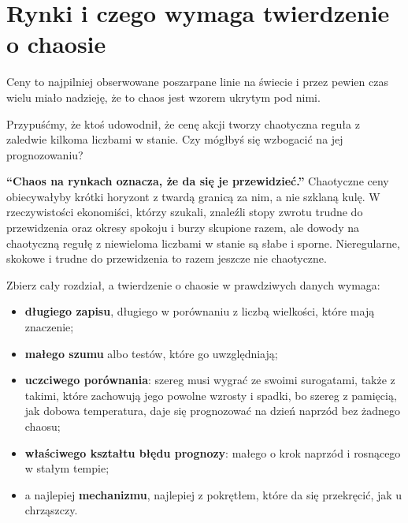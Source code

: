 \section{Rynki i czego wymaga twierdzenie o chaosie}
\label{sec:ch15-evidence}

\noindent
Ceny to najpilniej obserwowane poszarpane linie na świecie i przez pewien czas
wielu miało nadzieję, że to chaos jest wzorem ukrytym pod nimi.

\begin{think}
Przypuśćmy, że ktoś udowodnił, że cenę akcji tworzy chaotyczna reguła z
zaledwie kilkoma liczbami w stanie. Czy mógłbyś się wzbogacić na jej
prognozowaniu?
\end{think}

\begin{trapbox}
\textbf{\enquote{Chaos na rynkach oznacza, że da się je przewidzieć.}}
Chaotyczne ceny obiecywałyby krótki horyzont z twardą granicą za nim, a nie
szklaną kulę. W rzeczywistości ekonomiści, którzy szukali, znaleźli stopy
zwrotu trudne do przewidzenia oraz okresy spokoju i burzy skupione razem, ale
dowody na chaotyczną regułę z niewieloma liczbami w stanie są słabe i sporne.
Nieregularne, skokowe i trudne do przewidzenia to razem jeszcze nie chaotyczne.
\end{trapbox}

\noindent
Zbierz cały rozdział, a twierdzenie o chaosie w prawdziwych danych wymaga:

\begin{itemize}
\item \textbf{długiego zapisu}, długiego w porównaniu z liczbą wielkości,
  które mają znaczenie;
\item \textbf{małego szumu} albo testów, które go uwzględniają;
\item \textbf{uczciwego porównania}: szereg musi wygrać ze swoimi surogatami,
  także z takimi, które zachowują jego powolne wzrosty i spadki, bo szereg z
  pamięcią, jak dobowa temperatura, daje się prognozować na dzień naprzód bez
  żadnego chaosu;
\item \textbf{właściwego kształtu błędu prognozy}: małego o krok naprzód i
  rosnącego w stałym tempie;
\item a najlepiej \textbf{mechanizmu}, najlepiej z pokrętłem, które da się
  przekręcić, jak u chrząszczy.
\end{itemize}

